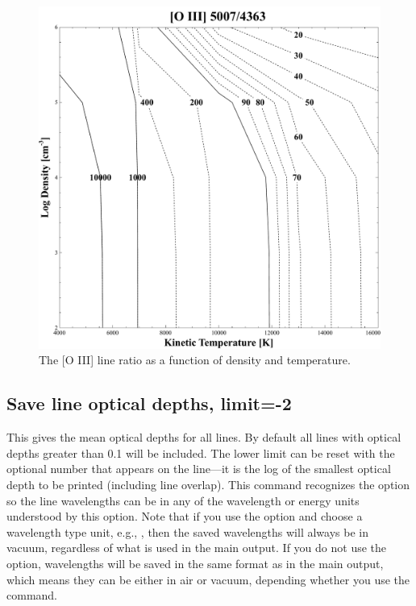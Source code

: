 \begin{figure}
\centering
\includegraphics[scale=0.4]{SaveLineRatio}
\caption[Save line ratio example]{
\label{fig:SaveLineRatio}
The [O III] line ratio as a function of density and temperature.}
\end{figure}

\subsection{Save line optical depths, limit=-2}

This gives the mean optical depths for all lines.  By default all lines
with optical depths greater than 0.1 will be included.  The lower limit
can be reset with the optional number that appears on the line---it is the
log of the smallest optical depth to be printed (including line overlap).
This command recognizes the  option so the line
wavelengths can be in any of the wavelength or energy units
understood by this option. Note that if you use the  option
and choose a wavelength type unit, e.g., , then the saved
wavelengths will always be in vacuum, regardless of what is used in the main
output. If you do not use the  option, wavelengths will be
saved in the same format as in the main output, which means they can be either
in air or vacuum, depending whether you use the 
command.

